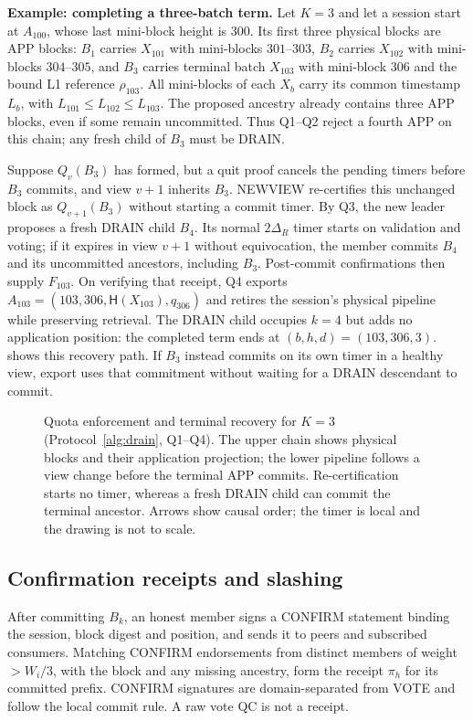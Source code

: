 \documentclass[11pt,a4paper,onecolumn]{article}
\newcommand{\Hash}{\mathsf H}
\begin{document}
\smallskip
{}
\noindent\textbf{Example: completing a three-batch term.}
Let $K=3$ and let a session start at $A_{100}$, whose last mini-block
height is $300$. Its first three physical blocks are APP blocks:
$B_1$ carries $X_{101}$ with mini-blocks $301$--$303$,
$B_2$ carries $X_{102}$ with mini-blocks $304$--$305$, and
$B_3$ carries terminal batch $X_{103}$ with mini-block $306$ and the
bound L1 reference $\rho_{103}$. All mini-blocks of each $X_b$ carry its
common timestamp $L_b$, with $L_{101}\leq L_{102}\leq L_{103}$.
The proposed ancestry already contains three APP blocks, even if some
remain uncommitted. Thus Q1--Q2 reject a fourth APP on this chain;
any fresh child of $B_3$ must be DRAIN.

Suppose $Q_v(B_3)$ has formed, but a quit proof cancels the pending
timers before $B_3$ commits, and view $v+1$ inherits $B_3$.
NEWVIEW re-certifies this unchanged block as $Q_{v+1}(B_3)$ without
starting a commit timer. By Q3, the new leader proposes a fresh DRAIN
child $B_4$. Its normal $2\Delta_R$ timer starts on validation and voting;
if it expires in view $v+1$ without equivocation, the member commits
$B_4$ and its uncommitted ancestors, including $B_3$.
Post-commit confirmations then supply $F_{103}$. On verifying that
receipt, Q4 exports
$A_{103}=(103,306,\Hash(X_{103}),q_{306})$ and retires the session's
physical pipeline while preserving retrieval.
The DRAIN child occupies $k=4$ but adds no application position:
the completed term ends at $(b,h,d)=(103,306,3)$.
 shows this recovery path. If $B_3$ instead
commits on its own timer in a healthy view, export uses that commitment
without waiting for a DRAIN descendant to commit.

\begin{figure}[H]\centering

\caption{Quota enforcement and terminal recovery for $K=3$
(Protocol~\ref{alg:drain}, Q1--Q4). The upper chain shows physical blocks
and their application projection; the lower pipeline follows a view change
before the terminal APP commits. Re-certification starts no timer, whereas
a fresh DRAIN child can commit the terminal ancestor. Arrows show causal
order; the timer is local and the drawing is not to scale.}
\label{fig:terminal-drain}
\end{figure}

\subsection{Confirmation receipts and slashing}\label{sec:receipt}
After committing $B_k$, an honest member signs a CONFIRM statement binding
the session, block digest and position, and sends it to peers and subscribed
consumers. Matching CONFIRM endorsements from distinct members of weight
$>W_i/3$, with the block and any missing ancestry, form the receipt $\pi_h$
for its committed prefix. CONFIRM signatures are domain-separated from VOTE
and follow the local commit rule. A raw vote QC is not a receipt.
\end{document}
